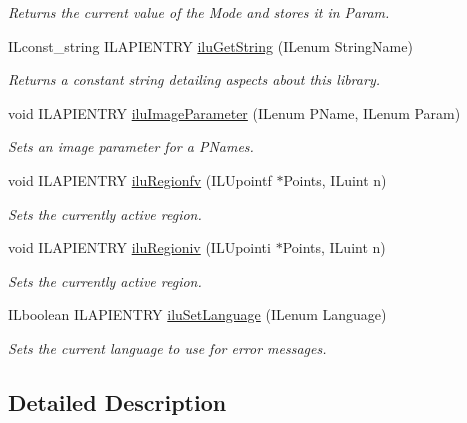 \begin{DoxyCompactItemize}
\begin{DoxyCompactList}\small\item\em Returns the current value of the {\itshape Mode} and stores it in {\itshape Param}. \end{DoxyCompactList}\item 
I\+Lconst\+\_\+string I\+L\+A\+P\+I\+E\+N\+T\+R\+Y \hyperlink{group__ilu__state_ga8c572ee3c422dfcc4991aeff712d1804}{ilu\+Get\+String} (I\+Lenum String\+Name)
\begin{DoxyCompactList}\small\item\em Returns a constant string detailing aspects about this library. \end{DoxyCompactList}\item 
void I\+L\+A\+P\+I\+E\+N\+T\+R\+Y \hyperlink{group__ilu__state_ga1f7db294cdcd2a8285ae24c29bb1f750}{ilu\+Image\+Parameter} (I\+Lenum P\+Name, I\+Lenum Param)
\begin{DoxyCompactList}\small\item\em Sets an image parameter for a {\itshape P\+Names}. \end{DoxyCompactList}\item 
void I\+L\+A\+P\+I\+E\+N\+T\+R\+Y \hyperlink{group__ilu__state_gaa26c0daed6573bf4a1c8f8146de2dbfc}{ilu\+Regionfv} (I\+L\+Upointf $\ast$Points, I\+Luint n)
\begin{DoxyCompactList}\small\item\em Sets the currently active region. \end{DoxyCompactList}\item 
void I\+L\+A\+P\+I\+E\+N\+T\+R\+Y \hyperlink{group__ilu__state_gaf22304a1fa0728ee5fadf4d92effdb50}{ilu\+Regioniv} (I\+L\+Upointi $\ast$Points, I\+Luint n)
\begin{DoxyCompactList}\small\item\em Sets the currently active region. \end{DoxyCompactList}\item 
I\+Lboolean I\+L\+A\+P\+I\+E\+N\+T\+R\+Y \hyperlink{group__ilu__state_ga4c2e7c06c4a5677dbe58cba9c5ed075e}{ilu\+Set\+Language} (I\+Lenum Language)
\begin{DoxyCompactList}\small\item\em Sets the current language to use for error messages. \end{DoxyCompactList}\end{DoxyCompactItemize}


\subsection{Detailed Description}



